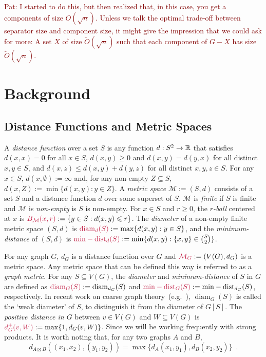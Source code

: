 \documentclass{patmorin}
\makeatletter
\renewcommand{\ge}{\geqslant}
\renewcommand{\le}{\leqslant}
\renewcommand{\geq}{\geqslant}
\newcommand{\pat}[1]{\textcolor{Maroon}{Pat: #1}}
\newcommand{\defin}[1]{\emph{\textcolor{brightmaroon}{#1}}}
\def\mathcolor#1#{\@mathcolor{#1}}
\def\@mathcolor#1#2#3{%
  \protect\leavevmode
  \begingroup
    \color#1{#2}#3%
  \endgroup
}
\newcommand{\mathdefin}[1]{\mathcolor{brightmaroon}{#1}}
\DeclareMathOperator{\diam}{diam}
\DeclareMathOperator{\mindist}{min-dist}
\makeatother
\begin{document}
\pat{I started to do this, but then realized that, in this case, you get a components of size $O(\sqrt{n})$.  Unless we talk the optimal trade-off between separator size and component size, it might give the impression that we could ask for more:  A set $X$ of size $\tilde{O}(\sqrt{n})$ such that each component of $G-X$ has size $\tilde{O}(\sqrt{n})$.  }

\section{Background}

\subsection{Distance Functions and Metric Spaces}

A \defin{distance function} over a set $S$ is any function $d:S^2\to\mathbb{R}$ that satisfies $d(x,x)=0$ for all $x\in S$, $d(x,y)\ge 0$ and $d(x,y)=d(y,x)$ for all distinct $x,y\in S$, and $d(x,z) \le d(x,y)+d(y,z)$ for all distinct $x,y,z\in S$.  For any $x\in S$, $d(x,\emptyset):=\infty$ and, for any non-empty $Z\subseteq S$, $d(x,Z):=\min\{d(x,y):y\in Z\}$.  A \defin{metric space} $\mathcal{M}:=(S,d)$ consists of a set $S$ and a distance function $d$ over some superset of $S$. $\mathcal{M}$ is \defin{finite} if $S$ is finite and $\mathcal{M}$ is \defin{non-empty} is $S$ is non-empty.  For $x\in S$ and $r\geq 0$, the \defin{$r$-ball} centered at $x$ is $\mathdefin{B_{\mathcal{M}}(x,r)}:=\{y\in S:d(x,y)\le r\}$.  The \defin{diameter} of a non-empty finite metric space $(S,d)$ is $\mathdefin{\diam_d(S)}:=\max\{d(x,y):y\in S\}$, and the
\defin{minimum-distance} of $(S,d)$ is $\mathdefin{\mindist_d(S)}:=\min\{d(x,y): \{x,y\}\in\binom{S}{2}\}$.

For any graph $G$, $d_G$ is a distance function over $G$ and $\mathdefin{\mathcal{M}_G}:=(V(G),d_G)$ is a metric space. Any metric space that can be defined this way is referred to as a \defin{graph metric}. For any $S\subseteq V(G)$, the \defin{diameter} and \defin{minimum-distance} of $S$ in $G$ are defined as $\mathdefin{\diam_G(S)}:=\diam_{d_G}(S)$ and $\mathdefin{\mindist_G(S)}:=\mindist_{d_G}(S)$, respectively. In recent work on coarse graph theory~(e.g.~\citep{DN23,BBEGLPS}), $\diam_G(S)$ is called the `weak diameter' of $S$, to distinguish it from the diameter of $G[S]$.
The \defin{positive distance in $G$} between $v\in V(G)$ and $W\subseteq V(G)$ is $\mathdefin{d^+_G(v,W)}:=\max\{1,d_G(v,W)\}$.
Since we will be working frequently with strong products. It is worth noting that, for any two graphs $A$ and $B$,
\[
  d_{A\boxtimes B}((x_1,x_2),(y_1,y_2))=\max\{d_A(x_1,y_1),d_B(x_2,y_2)\} \enspace .
\]
\end{document}
